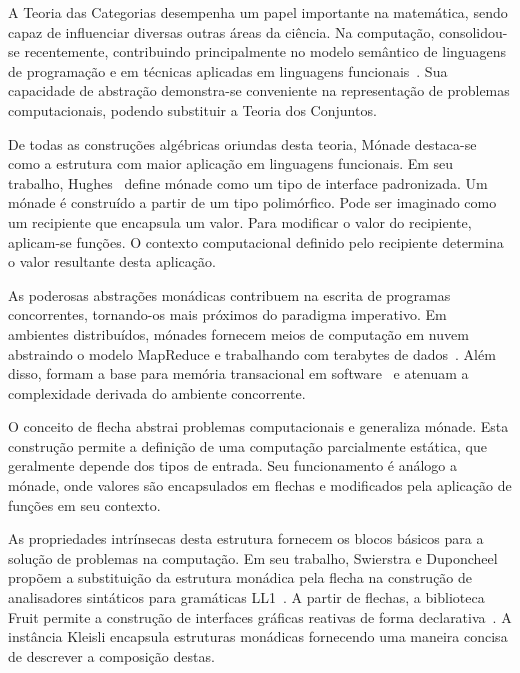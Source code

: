 \documentclass[10pt, conference]{IEEEtran}
\begin{document}
A Teoria das Categorias desempenha um papel importante na matemática, sendo capaz de influenciar diversas outras áreas da ciência. Na computação, consolidou-se recentemente, contribuindo principalmente no modelo semântico de linguagens de programação e em técnicas aplicadas em linguagens funcionais~\cite{pierce1990taste, carlos2006caracteristicas}. Sua capacidade de abstração demonstra-se conveniente na representação de problemas computacionais, podendo substituir a Teoria dos Conjuntos.

De todas as construções algébricas oriundas desta teoria, Mónade destaca-se como a estrutura com maior aplicação em linguagens funcionais. Em seu trabalho, Hughes~\cite{hughes2000generalising} define mónade como um tipo de interface padronizada. Um mónade é construído a partir de um tipo polimórfico. Pode ser imaginado como um recipiente que encapsula um valor. Para modificar o valor do recipiente, aplicam-se funções. O contexto computacional definido pelo recipiente determina o valor resultante desta aplicação.

As poderosas abstrações monádicas contribuem na escrita de programas concorrentes, tornando-os mais próximos do paradigma imperativo. Em ambientes distribuídos, mónades fornecem meios de computação em nuvem abstraindo o modelo MapReduce e trabalhando com terabytes de dados~\cite{dean2008mapreduce, dzik2013mbrace}. Além disso, formam a base para memória transacional em software~\cite{jones2007beautiful} e atenuam a complexidade derivada do ambiente concorrente.

O conceito de flecha abstrai problemas computacionais e generaliza mónade. Esta construção permite a definição de uma computação parcialmente estática, que geralmente depende dos tipos de entrada. Seu funcionamento é análogo a mónade, onde valores são encapsulados em flechas e modificados pela aplicação de funções em seu contexto.

As propriedades intrínsecas desta estrutura fornecem os blocos básicos para a solução de problemas na computação. Em seu trabalho, Swierstra e Duponcheel propõem a substituição da estrutura monádica pela flecha na construção de analisadores sintáticos para gramáticas LL1~\cite{swierstra1996deterministic}. A partir de flechas, a biblioteca Fruit permite a construção de interfaces gráficas reativas de forma declarativa~\cite{courtney2001genuinely, courtney2003yampa}. A instância Kleisli encapsula estruturas monádicas fornecendo uma maneira concisa de descrever a composição destas.
\end{document}
